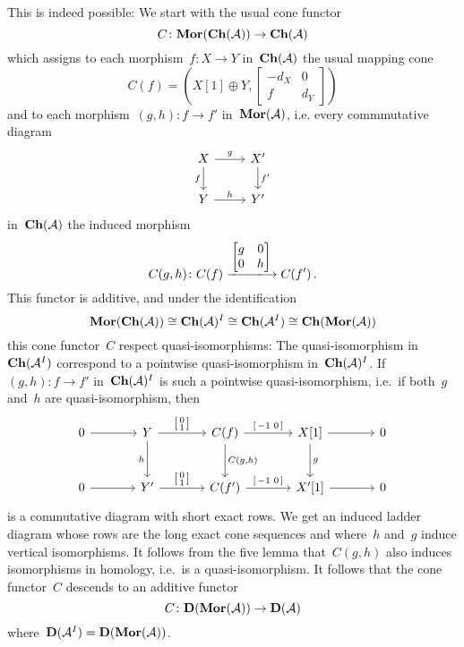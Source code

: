 \documentclass[a4paper,10pt]{scrartcl}
\begin{document}
This is indeed possible:
We start with the usual cone functor
\[
  C
  \colon
  \mathbf{Mor}(\mathbf{Ch}(\mathcal{A}))
  \to
  \mathbf{Ch}(\mathcal{A})
\]
which assigns to each morphism~$f \colon X \to Y$ in~$\mathbf{Ch}(\mathcal{A})$ the usual mapping cone
\[
  C(f)
  =
  \left(
    X[1] \oplus Y,
    \begin{bmatrix}
      -d_X & 0   \\
        f   & d_Y
    \end{bmatrix}
  \right)
\]
and to each morphism~$(g,h) \colon f \to f'$ in~$\mathbf{Mor}(\mathcal{A})$, i.e. every commmutative diagram
\[
  \begin{tikzcd}
    X
    \arrow{r}[above]{g}
    \arrow{d}[left]{f}
    &
    X'
    \arrow{d}[right]{f'}
    \\
    Y
    \arrow{r}[above]{h}
    &
    Y'
  \end{tikzcd}
\]
in~$\mathbf{Ch}(\mathcal{A})$ the induced morphism
\[
  C(g,h)
  \colon
  C(f)
  \xlongto{ \begin{bmatrix} g & 0 \\ 0 & h \end{bmatrix} }
  C(f') \,.
\]
This functor is additive, and under the identification
\[
  \mathbf{Mor}(\mathbf{Ch}(\mathcal{A}))
  \cong
  \mathbf{Ch}(\mathcal{A})^I
  \cong
  \mathbf{Ch}(\mathcal{A}^I)
  \cong
  \mathbf{Ch}(\mathbf{Mor}(\mathcal{A}))
\]
this cone functor~$C$ respect quasi-isomorphisms:
The quasi-isomorphism in~$\mathbf{Ch}(\mathcal{A}^I)$ correspond to a pointwise quasi-isomorphism in~$\mathbf{Ch}(\mathcal{A})^I$.
If~$(g,h) \colon f \to f'$ in~$\mathbf{Ch}(\mathcal{A})^I$ is such a pointwise quasi-isomorphism, i.e.\ if both~$g$ and~$h$ are quasi-isomorphism, then
\[
  \begin{tikzcd}[sep = large, ampersand replacement = \&]
    0
    \arrow{r}
    \&
    Y
    \arrow{r}[above]{\begin{bsmallmatrix} 0 \\ 1 \end{bsmallmatrix}}
    \arrow{d}[left]{h}
    \&
    C(f)
    \arrow{r}[above]{\begin{bsmallmatrix} -1 & 0 \end{bsmallmatrix}}
    \arrow{d}[right]{C(g,h)}
    \&
    X[1]
    \arrow{r}
    \arrow{d}[right]{g}
    \&
    0
    \\
    0
    \arrow{r}
    \&
    Y'
    \arrow{r}[above]{\begin{bsmallmatrix} 0 \\ 1 \end{bsmallmatrix}}
    \&
    C(f')
    \arrow{r}[above]{\begin{bsmallmatrix} -1 & 0 \end{bsmallmatrix}}
    \&
    X'[1]
    \arrow{r}
    \&
    0
  \end{tikzcd}
\]
is a commutative diagram with short exact rows.
We get an induced ladder diagram whose rows are the long exact cone sequences and where~$h$ and~$g$ induce vertical isomorphisms.
It follows from the five lemma that~$C(g,h)$ also induces isomorphisms in homology, i.e.\ is a quasi-isomorphism.
It follows that the cone functor~$C$ descends to an additive functor
\[
  C
  \colon
  \mathbf{D}( \mathbf{Mor}(\mathcal{A}) )
  \to
  \mathbf{D}( \mathcal{A} )
\]
where~$\mathbf{D}(\mathcal{A}^I) = \mathbf{D}(\mathbf{Mor}(\mathcal{A}))$.
\end{document}

